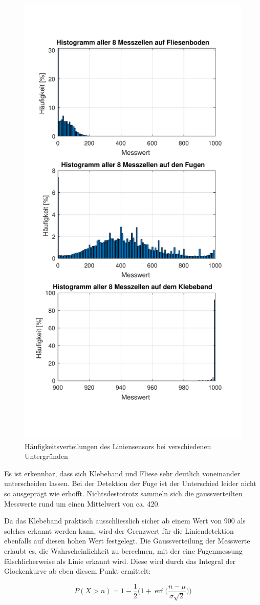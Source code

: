 \documentclass[main.tex]{subfiles} %
\begin{document}
\begin{figure}[H]
    \centering
    \includegraphics[width=0.5\linewidth]{fig_Parametrierung_Linienfolgeregler/Histogramme_Liniensensor.pdf}
    \caption{Häufigkeitsverteilungen des Liniensensors bei verschiedenen Untergründen}\label{fig:Histogramme_LineSensor}
\end{figure}

Es ist erkennbar, dass sich Klebeband und Fliese sehr deutlich voneinander
unterscheiden lassen. Bei der Detektion der Fuge ist der Unterschied leider
nicht so ausgeprägt wie erhofft. Nichtsdestotrotz sammeln sich die
gaussverteilten Messwerte rund um einen Mittelwert von ca. 420.

Da das Klebeband praktisch ausschliesslich sicher ab einem Wert von 900 als
solches erkannt werden kann, wird der Grenzwert für die Liniendetektion
ebenfalls auf diesen hohen Wert festgelegt. Die Gaussverteilung der Messwerte
erlaubt es, die Wahrscheinlichkeit zu berechnen, mit der eine Fugenmessung
fälschlicherweise als Linie erkannt wird. Diese wird durch das Integral der
Glockenkurve ab eben diesem Punkt ermittelt:

\[
    P(X > n) = 1 - \frac{1}{2} \Bigg( 1 + \operatorname{erf}\!\Bigg( \frac{n - \mu}{\sigma \sqrt{2}} \Bigg) \Bigg)
\]
\end{document}
